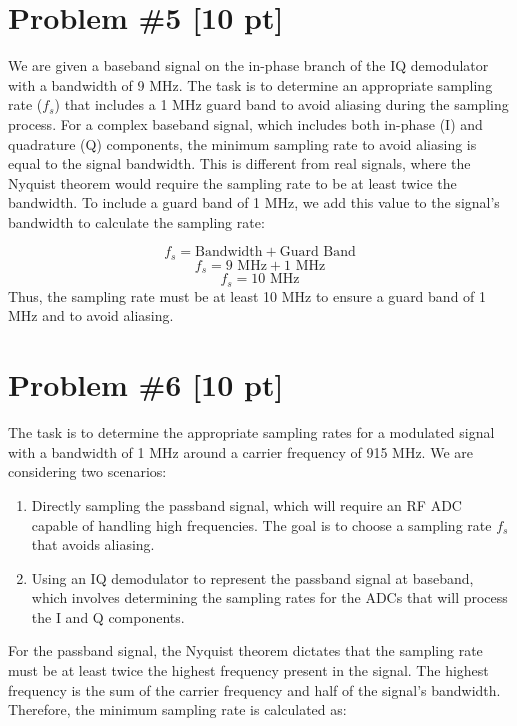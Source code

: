 \documentclass{article}
\begin{document}
\newpage
\section*{Problem \#5 [10 pt]}
We are given a baseband signal on the in-phase branch of the IQ demodulator with a bandwidth of 9 MHz. The task is to determine an appropriate sampling rate (\( f_s \)) that includes a 1 MHz guard band to avoid aliasing during the sampling process.
\newline\newline
For a complex baseband signal, which includes both in-phase (I) and quadrature (Q) components, the minimum sampling rate to avoid aliasing is equal to the signal bandwidth. This is different from real signals, where the Nyquist theorem would require the sampling rate to be at least twice the bandwidth.
\newline\newline
To include a guard band of 1 MHz, we add this value to the signal's bandwidth to calculate the sampling rate:

\[ f_s = \text{Bandwidth} + \text{Guard Band} \]
\[ f_s = 9 \text{ MHz} + 1 \text{ MHz} \]
\[ f_s = 10 \text{ MHz} \]
\newline\newline
Thus, the sampling rate must be at least 10 MHz to ensure a guard band of 1 MHz and to avoid aliasing.
\newpage

\section*{Problem \#6 [10 pt]}
The task is to determine the appropriate sampling rates for a modulated signal with a bandwidth of 1 MHz around a carrier frequency of 915 MHz. We are considering two scenarios:
\begin{enumerate}
    \item Directly sampling the passband signal, which will require an RF ADC capable of handling high frequencies. The goal is to choose a sampling rate \( f_s \) that avoids aliasing.
    \item Using an IQ demodulator to represent the passband signal at baseband, which involves determining the sampling rates for the ADCs that will process the I and Q components.
\end{enumerate}
\noindent
For the passband signal, the Nyquist theorem dictates that the sampling rate must be at least twice the highest frequency present in the signal. The highest frequency is the sum of the carrier frequency and half of the signal's bandwidth. Therefore, the minimum sampling rate is calculated as:
\end{document}
